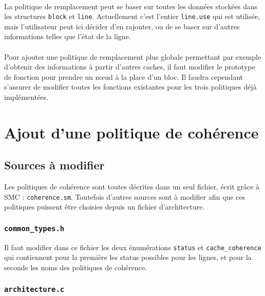 \paragraph{}
La politique de remplacement peut se baser sur toutes les données stockées dans les structures \texttt{block} et \texttt{line}. Actuellement c'est l'entier \texttt{line.use} qui est utilisée, mais l'utilisateur peut ici décider d'en rajouter, ou de se baser sur d'autres informations telles que l'état de la ligne.

\paragraph{}
Pour ajouter une politique de remplacement plus globale permettant par exemple d'obtenir des informations à partir d'autres caches, il faut modifier le prototype de fonction pour prendre un n{\oe}ud à la place d'un bloc. Il faudra cependant s'assurer de modifier toutes les fonctions existantes pour les trois politiques déjà implémentées.

\section{Ajout d'une politique de cohérence}
\label{tuto_aut}

\subsection{Sources à modifier}

Les politiques de cohérence sont toutes décrites dans un seul fichier, écrit grâce à \textsf{SMC} : \texttt{coherence.sm}. Toutefois d'autres sources sont à modifier afin que ces politiques puissent être choisies depuis un fichier d'architecture.

\subsubsection{\texttt{common\_types.h}}

Il faut modifier dans ce fichier les deux énumérations \texttt{status} et \texttt{cache\_coherence} qui contiennent pour la première les status possibles pour les lignes, et pour la seconde les noms des politiques de cohérence.

\subsubsection{\texttt{architecture.c}}


